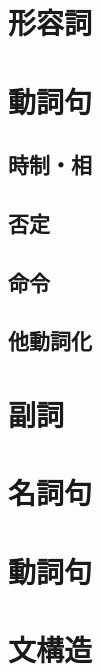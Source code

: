 \section{形容詞} %
\newpage

\section{動詞句} %
\subsection{時制・相} %
\subsection{否定} %
\subsection{命令} %
\subsection{他動詞化} %
\newpage

\section{副詞}
\newpage

\section{名詞句}
\newpage

\section{動詞句}
\newpage

\section{文構造}

